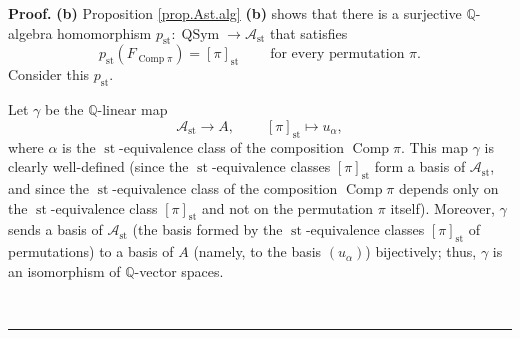 \documentclass[numbers=enddot,12pt,final,onecolumn,notitlepage]{scrartcl}%
\theoremstyle{definition}
\newenvironment{proof}[1][Proof]{\noindent\textbf{#1.} }{\ \rule{0.5em}{0.5em}}
\newenvironment{verlong}{}{}
\begin{document}
\begin{verlong}
\begin{proof}
\textbf{(b)} Proposition \ref{prop.Ast.alg} \textbf{(b)} shows that there is a
surjective $\mathbb{Q}$-algebra homomorphism $p_{\operatorname{st}%
}:\operatorname*{QSym}\rightarrow\mathcal{A}_{\operatorname{st}}$ that
satisfies
\begin{equation}
p_{\operatorname{st}}\left(  F_{\operatorname*{Comp}\pi}\right)  =\left[
\pi\right]  _{\operatorname{st}}\ \ \ \ \ \ \ \ \ \ \text{for every
permutation }\pi. \label{pf.thm.4.3.b.pst}%
\end{equation}
Consider this $p_{\operatorname{st}}$.

Let $\gamma$ be the $\mathbb{Q}$-linear map%
\[
\mathcal{A}_{\operatorname{st}}\rightarrow A,\ \ \ \ \ \ \ \ \ \ \left[
\pi\right]  _{\operatorname{st}}\mapsto u_{\alpha},
\]
where $\alpha$ is the $\operatorname{st}$-equivalence class of the
composition $\operatorname*{Comp}\pi$. This map $\gamma$ is clearly
well-defined (since the $\operatorname{st}$-equivalence classes $\left[
\pi\right]  _{\operatorname{st}}$ form a basis of $\mathcal{A}%
_{\operatorname{st}}$, and since the $\operatorname{st}$-equivalence class
of the composition $\operatorname*{Comp}\pi$ depends only on the
$\operatorname{st}$-equivalence class $\left[  \pi\right]
_{\operatorname{st}}$ and not on the permutation $\pi$ itself). Moreover,
$\gamma$ sends a basis of $\mathcal{A}_{\operatorname{st}}$ (the basis formed
by the $\operatorname{st}$-equivalence classes $\left[  \pi\right]
_{\operatorname{st}}$ of permutations) to a basis of $A$ (namely, to the
basis $\left(  u_{\alpha}\right)  $) bijectively; thus, $\gamma$ is an
isomorphism of $\mathbb{Q}$-vector spaces.


\end{proof}
\end{verlong}
\end{document}
